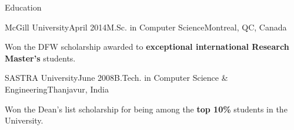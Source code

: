 \documentclass{resume} %
\begin{document}
 
\begin{rSection}{Education}

\begin{rSubsection}{McGill University}{April 2014}{M.Sc. in
Computer Science}{Montreal, QC, Canada} 
\item Won the DFW scholarship awarded to \textbf{exceptional international
        Research Master's} students.
\end{rSubsection}

\begin{rSubsection}{SASTRA University}{June 2008}{B.Tech. in Computer Science
\& Engineering}{Thanjavur, India} 
\item Won the {Dean's list scholarship} for being among the \textbf{top
10\%} students in the University. 
\end{rSubsection}

\end{rSection}

%


\end{document}
